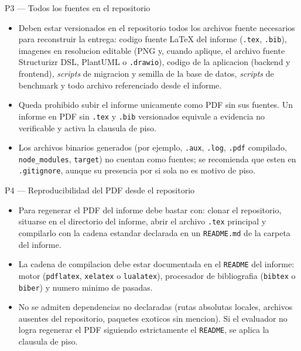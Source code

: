 \documentclass[11pt,a4paper]{article}
\begin{document}
\begin{cajacritica}{P3 --- Todos los fuentes en el repositorio}
    \begin{itemize}
        \item Deben estar versionados en el repositorio todos los archivos fuente necesarios para reconstruir la entrega: codigo fuente LaTeX del informe (\texttt{.tex}, \texttt{.bib}), imagenes en resolucion editable (PNG y, cuando aplique, el archivo fuente Structurizr DSL, PlantUML o \texttt{.drawio}), codigo de la aplicacion (backend y frontend), \emph{scripts} de migracion y semilla de la base de datos, \emph{scripts} de benchmark y todo archivo referenciado desde el informe.
        \item Queda prohibido subir el informe unicamente como PDF sin sus fuentes. Un informe en PDF sin \texttt{.tex} y \texttt{.bib} versionados equivale a evidencia no verificable y activa la clausula de piso.
        \item Los archivos binarios generados (por ejemplo, \texttt{.aux}, \texttt{.log}, \texttt{.pdf} compilado, \texttt{node\_modules}, \texttt{target}) no cuentan como fuentes; se recomienda que esten en \texttt{.gitignore}, aunque su presencia por si sola no es motivo de piso.
    \end{itemize}
\end{cajacritica}

\begin{cajacritica}{P4 --- Reproducibilidad del PDF desde el repositorio}
    \begin{itemize}
        \item Para regenerar el PDF del informe debe bastar con: clonar el repositorio, situarse en el directorio del informe, abrir el archivo \texttt{.tex} principal y compilarlo con la cadena estandar declarada en un \texttt{README.md} de la carpeta del informe.
        \item La cadena de compilacion debe estar documentada en el \texttt{README} del informe: motor (\texttt{pdflatex}, \texttt{xelatex} o \texttt{lualatex}), procesador de bibliografia (\texttt{bibtex} o \texttt{biber}) y numero minimo de pasadas.
        \item No se admiten dependencias no declaradas (rutas absolutas locales, archivos ausentes del repositorio, paquetes exoticos sin mencion). Si el evaluador no logra regenerar el PDF siguiendo estrictamente el \texttt{README}, se aplica la clausula de piso.
    \end{itemize}
\end{cajacritica}
\end{document}
